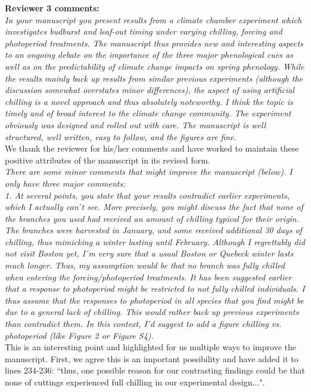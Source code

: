 \documentclass[11pt,a4paper]{article}
\begin{document}
{\bf Reviewer 3 comments:} \\


\emph{In your manuscript you present results from a climate chamber experiment which investigates
budburst and leaf-out timing under varying chilling, forcing and photoperiod treatments.
The manuscript thus provides new and interesting aspects to an ongoing debate on the
importance of the three major phenological cues as well as on the predictability of climate
change impacts on spring phenology. While the results mainly back up results from similar
previous experiments (although the discussion somewhat overstates minor differences), the
aspect of using artificial chilling is a novel approach and thus absolutely noteworthy.
I think the topic is timely and of broad interest to the climate change community. The
experiment obviously was designed and rolled out with care. The manuscript is well
structured, well written, easy to follow, and the figures are fine.}\\

We thank the reviewer for his/her comments and have worked to maintain these positive attributes of the manuscript in its revised form. \\

\emph{There are some minor comments that might improve the manuscript (below). I only have three
major comments:\\
1.      At several points, you state that your results contradict earlier experiments, which
I actually can ́t see. More precisely, you might discuss the fact that none of the branches
you used had received an amount of chilling typical for their origin. The branches were
harvested in January, and some received additional 30 days of chilling, thus mimicking a
winter lasting until February. Although I regrettably did not visit Boston yet, I ́m very sure
that a usual Boston or Quebeck winter lasts much longer. Thus, my assumption would be that no
branch was fully chilled when entering the forcing/photoperiod treatments. It has been
suggested earlier that a response to photoperiod might be restricted to not fully chilled
individuals. I thus assume that the responses to photoperiod in all species that you find
might be due to a general lack of chilling. This would rather back up previous experiments
than contradict them.
In this context, I ́d suggest to add a figure chilling vs. photoperiod (like Figure 2 or
Figure S4).}\\

This is an interesting point and highlighted for us multiple ways to improve the manuscript. First, we agree this is an important possibility and have added it to lines 234-236: ``thus, one possible reason for our contrasting findings could be that none of cuttings experienced full chilling in our experimental design...".\\
\end{document}

